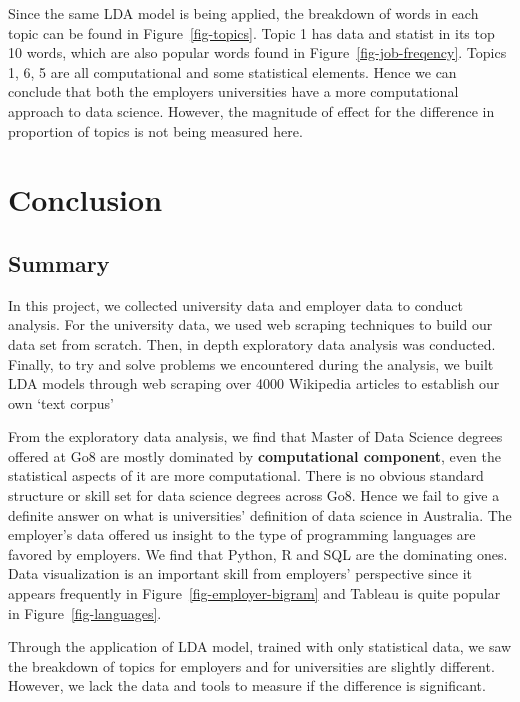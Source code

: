 \documentclass[
  letterpaper,
]{report}
\begin{document}
Since the same LDA model is being applied, the breakdown of words in
each topic can be found in Figure~\ref{fig-topics}. Topic 1 has data and
statist in its top 10 words, which are also popular words found in
Figure~\ref{fig-job-freqency}. Topics 1, 6, 5 are all computational and
some statistical elements. Hence we can conclude that both the employers
universities have a more computational approach to data science.
However, the magnitude of effect for the difference in proportion of
topics is not being measured here.


\hypertarget{sec-conclude}{%
\chapter{Conclusion}\label{sec-conclude}}

\hypertarget{summary}{%
\section{Summary}\label{summary}}

In this project, we collected university data and employer data to
conduct analysis. For the university data, we used web scraping
techniques to build our data set from scratch. Then, in depth
exploratory data analysis was conducted. Finally, to try and solve
problems we encountered during the analysis, we built LDA models through
web scraping over 4000 Wikipedia articles to establish our own `text
corpus'

From the exploratory data analysis, we find that Master of Data Science
degrees offered at Go8 are mostly dominated by \textbf{computational
component}, even the statistical aspects of it are more computational.
There is no obvious standard structure or skill set for data science
degrees across Go8. Hence we fail to give a definite answer on what is
universities' definition of data science in Australia. The employer's
data offered us insight to the type of programming languages are favored
by employers. We find that Python, R and SQL are the dominating ones.
Data visualization is an important skill from employers' perspective
since it appears frequently in Figure~\ref{fig-employer-bigram} and
Tableau is quite popular in Figure~\ref{fig-languages}.

Through the application of LDA model, trained with only statistical
data, we saw the breakdown of topics for employers and for universities
are slightly different. However, we lack the data and tools to measure
if the difference is significant.
\end{document}
